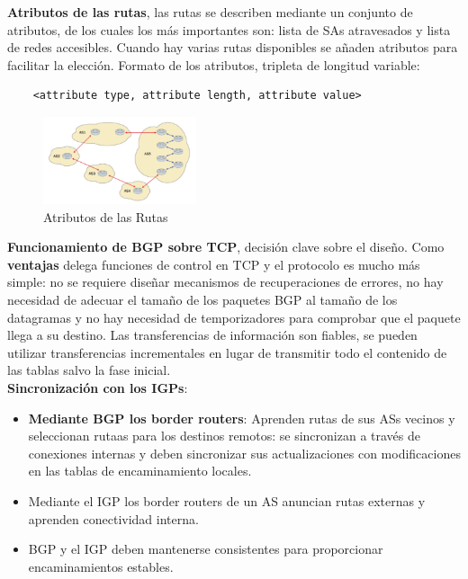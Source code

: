 \documentclass[10pt,portrait, twocolumn]{article}
\begin{document}
\textbf{Atributos de las rutas}, las rutas se describen mediante un conjunto de atributos, de los cuales los más importantes son: lista de SAs atravesados y lista de redes accesibles. Cuando hay varias rutas disponibles se añaden atributos para facilitar la elección. Formato de los atributos, tripleta de longitud variable:

	\begin{verbatim}
	<attribute type, attribute length, attribute value>
	\end{verbatim}

\begin{figure}[h]
	\centering
     \includegraphics[width=0.4\textwidth]{Rutas}
      \caption{Atributos de las Rutas}
      \label{fig:Regiones de frecuencias}
  \end{figure}

\textbf{Funcionamiento de BGP sobre TCP}, decisión clave sobre el diseño. Como \textbf{ventajas} delega funciones de control en TCP y el protocolo es mucho más simple: no se requiere diseñar mecanismos de recuperaciones de errores, no hay necesidad de adecuar el tamaño de los paquetes BGP al tamaño de los datagramas y no hay necesidad de temporizadores para comprobar que el paquete llega a su destino. Las transferencias de información son fiables, se pueden utilizar transferencias incrementales en lugar de transmitir todo el contenido de las tablas salvo la fase inicial.\\

\textbf{Sincronización con los IGPs}:

	\begin{itemize}
		\item \textbf{Mediante BGP los border routers}: Aprenden rutas de sus ASs vecinos y seleccionan rutaas para los destinos remotos: se sincronizan a través de conexiones internas y deben sincronizar sus actualizaciones con modificaciones en las tablas de encaminamiento locales.
		\item Mediante el IGP los border routers de un AS anuncian rutas externas y aprenden conectividad interna.
		\item BGP y el IGP deben mantenerse consistentes para proporcionar encaminamientos estables.
	\end{itemize}
	
\end{document}
